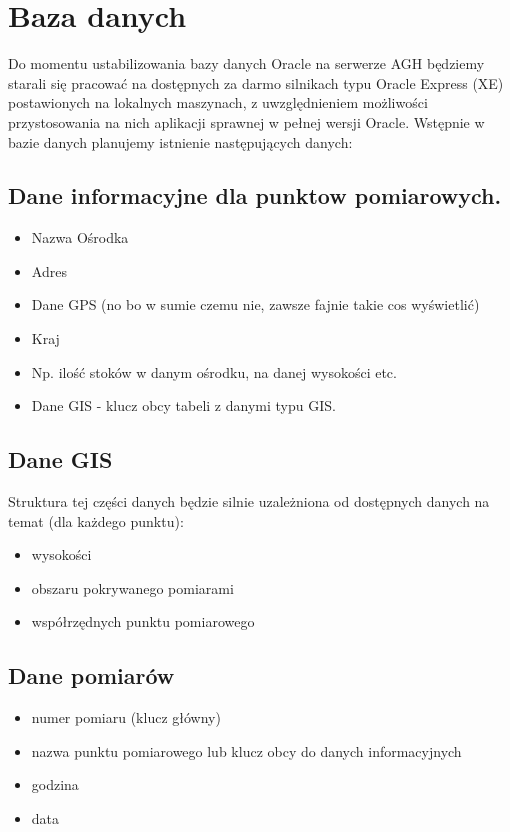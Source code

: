 \documentclass[12pt]{article}
\begin{document}
\section{Baza danych}
Do momentu ustabilizowania bazy danych Oracle na serwerze AGH będziemy starali
się pracować na dostępnych za darmo silnikach typu Oracle Express (XE)
  postawionych na lokalnych maszynach, z uwzględnieniem możliwości
  przystosowania na nich aplikacji sprawnej w pełnej wersji Oracle. Wstępnie w
  bazie danych planujemy istnienie następujących danych:
\subsection{Dane informacyjne dla punktow pomiarowych.}
\begin{itemize}
  \item Nazwa Ośrodka
  \item Adres
  \item Dane GPS (no bo w sumie czemu nie, zawsze fajnie takie cos wyświetlić)
  \item Kraj
  \item Np. ilość stoków w danym ośrodku, na danej wysokości etc.
  \item Dane GIS - klucz obcy tabeli z danymi typu GIS.
  \end{itemize}
\subsection{Dane GIS}
Struktura tej części danych będzie silnie uzależniona od dostępnych danych na temat (dla każdego punktu):
\begin{itemize}
  \item wysokości
  \item obszaru pokrywanego pomiarami
  \item współrzędnych punktu pomiarowego
\end{itemize}
\subsection{Dane pomiarów}
\begin{itemize}
  \item numer pomiaru (klucz główny)
  \item nazwa punktu pomiarowego lub klucz obcy do danych informacyjnych
  \item godzina
  \item data
\end{itemize}
\end{document}
